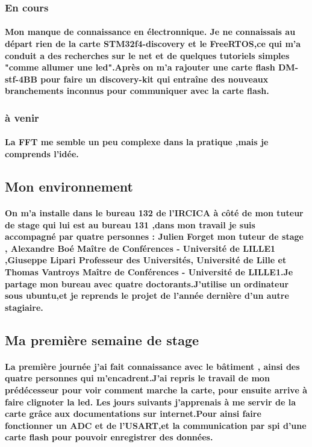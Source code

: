 \documentclass[a4paper]{article}
\begin{document}
\subsubsection{En cours}
    \paragraph{Mon manque de connaissance en électronnique. Je ne connaissais au départ rien de la carte STM32f4-discovery et le FreeRTOS,ce qui m'a conduit a des recherches sur le net et de quelques tutoriels simples "comme allumer une led".Après on m'a rajouter une carte flash DM-stf-4BB pour faire un discovery-kit qui entraîne des nouveaux branchements inconnus pour communiquer avec la carte flash.}
\subsubsection{à venir}
    \paragraph{La FFT me semble un peu complexe dans la pratique ,mais je comprends l'idée.}
    
\subsection{Mon environnement}
    \paragraph{On m'a installe dans le bureau 132 de l'IRCICA à côté de mon tuteur de stage qui lui est au bureau 131 ,dans mon travail je suis accompagné par quatre personnes : Julien Forget mon tuteur de stage , Alexandre Boé Maître de Conférences - Université de LILLE1 ,Giuseppe Lipari Professeur des Universités, Université de Lille et Thomas Vantroys Maître de Conférences - Université de LILLE1.Je partage mon bureau avec quatre doctorants.J'utilise un ordinateur sous ubuntu,et je reprends le projet de l'année dernière d'un autre stagiaire.}
    
\subsection{Ma première semaine de stage}
    \paragraph{La première journée j'ai fait connaissance avec le bâtiment , ainsi des quatre personnes qui m'encadrent.J'ai repris le travail de mon prédécesseur pour voir comment marche la carte, pour ensuite arrive à faire clignoter la led. Les jours suivants j'apprenais à me servir de la carte grâce aux documentations sur internet.Pour ainsi faire fonctionner un ADC et de l'USART,et la communication par spi d'une carte flash pour pouvoir enregistrer des données.   }
\end{document}
